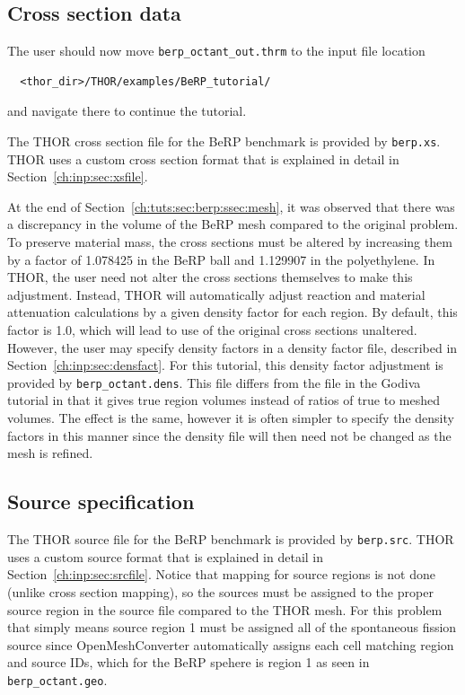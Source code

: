 \subsection{Cross section data}

The user should now move \verb"berp_octant_out.thrm" to the input file location
\begin{verbatim}
  <thor_dir>/THOR/examples/BeRP_tutorial/
\end{verbatim}
and navigate there to continue the tutorial.

The \ac{THOR} cross section file for the BeRP benchmark is provided by \verb"berp.xs".
\ac{THOR} uses a custom cross section format that is explained in detail in Section~\ref{ch:inp:sec:xsfile}.

At the end of Section~\ref{ch:tuts:sec:berp:ssec:mesh}, it was observed that there was a discrepancy in the volume of the BeRP mesh compared to the original problem.
To preserve material mass, the cross sections must be altered by increasing them by a factor of 1.078425 in the BeRP ball and 1.129907 in the polyethylene.
In \ac{THOR}, the user need not alter the cross sections themselves to make this adjustment.
Instead, \ac{THOR} will automatically adjust reaction and material attenuation calculations by a given density factor for each region.
By default, this factor is 1.0, which will lead to use of the original cross sections unaltered.
However, the user may specify density factors in a density factor file, described in Section~\ref{ch:inp:sec:densfact}.
For this tutorial, this density factor adjustment is provided by \verb"berp_octant.dens".
This file differs from the file in the Godiva tutorial in that it gives true region volumes instead of ratios of true to meshed volumes.
The effect is the same, however it is often simpler to specify the density factors in this manner since the density file will then need not be changed as the mesh is refined.

\subsection{Source specification}

The \ac{THOR} source file for the BeRP benchmark is provided by \verb"berp.src".
\ac{THOR} uses a custom source format that is explained in detail in Section~\ref{ch:inp:sec:srcfile}.
Notice that mapping for source regions is not done (unlike cross section mapping), so the sources must be assigned to the proper source region in the source file compared to the THOR mesh.
For this problem that simply means source region 1 must be assigned all of the spontaneous fission source since OpenMeshConverter automatically assigns each cell matching region and source IDs, which for the BeRP spehere is region 1 as seen in \verb"berp_octant.geo".

